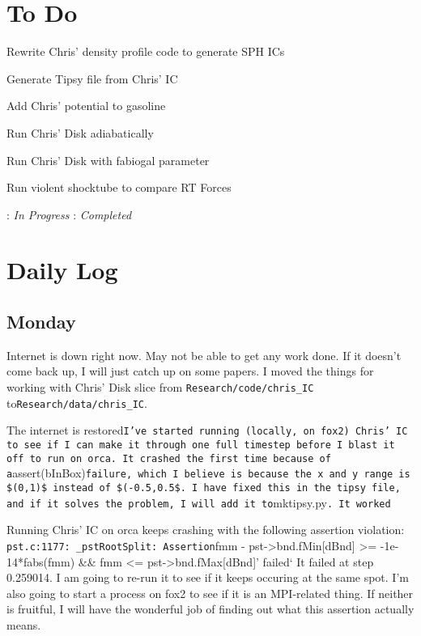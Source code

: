 \documentclass[11pt,letterpaper]{article}
\begin{document}
\section{To Do}
\begin{bullets}
\item[\checkmark] Rewrite Chris' density profile code to generate SPH ICs
\item[\checkmark] Generate Tipsy file from Chris' IC
\item[\checkmark] Add Chris' potential to gasoline
\item[\checkmark] Run Chris' Disk adiabatically
\item Run Chris' Disk with fabiogal parameter
\item[\checkmark] Run violent shocktube to compare RT Forces
\end{bullets}

\textleaf : \textit{In Progress} \qquad \checkmark : \textit{Completed}
\section{Daily Log}

\subsection{Monday}

Internet is down right now. May not be able to get any work done. If it
doesn't come back up, I will just catch up on some papers. I moved the
things for working with Chris' Disk slice from
\texttt{Research/code/chris\_IC} to\texttt{Research/data/chris\_IC}.

The internet is
restored\texttt{I've started running (locally, on fox2) Chris' IC to see if I can make it through one full timestep before I blast it off to run on orca.  It crashed the first time because of a}assert(bInBox)\texttt{failure, which I believe is because the x and y range is \$(0,1)\$ instead of \$(-0.5,0.5\$. I have fixed this in the tipsy file, and if it solves the problem, I will add  it to}mktipsy.py\texttt{.  It worked}

Running Chris' IC on orca keeps crashing with the following assertion
violation: \texttt{pst.c:1177: \_pstRootSplit: Assertion}fmm -
pst-\textgreater{}bnd.fMin{[}dBnd{]} \textgreater{}= -1e-14*fabs(fmm)
\&\& fmm \textless{}= pst-\textgreater{}bnd.fMax{[}dBnd{]}' failed` It
failed at step 0.259014. I am going to re-run it to see if it keeps
occuring at the same spot. I'm also going to start a process on fox2 to
see if it is an MPI-related thing. If neither is fruitful, I will have
the wonderful job of finding out what this assertion actually means.
\end{document}
